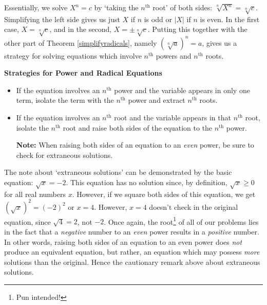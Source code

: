 \documentclass[10pt]{article}
\begin{document}
\medskip

Essentially, we solve $X^{n} = c$ by `taking the $n^{\text{th}}$ root' of both sides:  $\sqrt[n]{X^{n}} = \sqrt[n]{c}$. Simplifying the left side gives us just $X$ if $n$ is odd or $|X|$ if $n$ is even.  In the first case,  $X =  \sqrt[n]{c}$, and in the second, $X = \pm \sqrt[n]{c}$.  Putting this together with the other part of Theorem \ref{simplifyradicals}, namely $(\sqrt[n]{a})^n = a$, gives us a strategy for solving equations which involve $n^{\text{th}}$ powers and $n^{\text{th}}$ roots. 

\label{solvepowerandradicaleqns}

\medskip

\colorbox{ResultColor}{\bbm
\centerline{\textbf{Strategies for Power and Radical Equations}}

\begin{itemize}

\item  If the equation involves an $n^{\text{th}}$ power and the variable appears in only one term, isolate the term with the $n^{\text{th}}$ power and extract $n^{\text{th}}$ roots.

\item  If the equation involves an $n^{\text{th}}$ root and the variable appears in that $n^{\text{th}}$ root, isolate the $n^{\text{th}}$ root and raise both sides of the equation to the $n^{\text{th}}$ power.

\textbf{Note:}  When raising both sides of an equation to an \textit{even} power, be sure to check for extraneous solutions.

\end{itemize}

\ebm}

\medskip

The note about `extraneous solutions' can be demonstrated by the basic equation: $\sqrt{x} = -2$.  This equation has no solution since, by definition, $\sqrt{x} \geq 0$ for all real numbers $x$.  However, if we square both sides of this equation, we get $(\sqrt{x})^2 = (-2)^2$ or $x = 4$.  However, $x = 4$ doesn't check in the original equation, since $\sqrt{4} = 2$, not $-2$.  Once again, the root\footnote{Pun intended!} of all of our problems lies in the fact that a \textit{negative} number to an \textit{even} power results in a \textit{positive} number. In other words, raising both sides of an equation to an even power does \textit{not} produce an equivalent equation, but rather, an equation which may possess \textit{more} solutions than the original.  Hence the cautionary remark above about extraneous solutions.
\end{document}
